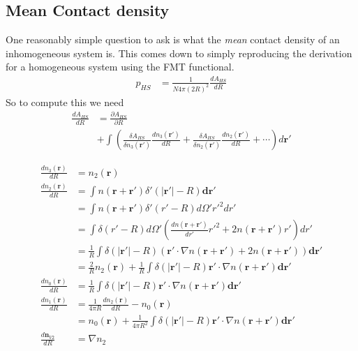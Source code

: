 \documentclass[letterpaper,twocolumn,amsmath,amssymb,prb]{revtex4-1}
\begin{document}
\begin{widetext}

\section{Mean Contact density}

One reasonably simple question to ask is what the \emph{mean} contact
density of an inhomogeneous system is.  This comes down to simply
reproducing the derivation for a homogeneous system using the
FMT functional.
\begin{align}
  p_{HS} &= \frac{1}{N 4\pi (2R)^2} \frac{dA_{HS}}{dR}
\end{align}
So to compute this we need
\begin{align}
  \frac{d A_{HS}}{d R} &=
  \frac{\partial A_{HS}}{\partial R} \\
  &+
  \int \left(
  \frac{\delta A_{HS}}{\delta n_3(\mathbf{r}')}
  \frac{d n_3(\mathbf{r}')}{d R}
  +
  \frac{\delta A_{HS}}{\delta n_2(\mathbf{r}')}
  \frac{d n_2(\mathbf{r}')}{d R}
  + \cdots
  \right) d\mathbf{r}'
\end{align}

\begin{align}
  \frac{dn_3(\mathbf{r})}{dR} &= n_2(\mathbf{r})\\
  \frac{dn_2(\mathbf{r})}{dR} &= \int n(\mathbf{r}+\mathbf{r}')
  \delta'(|\mathbf{r'}| - R)\mathbf{dr}'\\
  &= \int n(\mathbf{r}+\mathbf{r}')
  \delta'(r' - R) d\Omega' r'^2 dr'\\
  &= \int 
  \delta(r' - R) d\Omega' \left(\frac{dn(\mathbf{r}+\mathbf{r}')}{dr'}r'^2 + 2n(\mathbf{r}+\mathbf{r}')r' \right) dr'\\
  &= \frac1{R} \int 
  \delta(|\mathbf{r}'| - R)
  \left(\mathbf{r}'\cdot \nabla n(\mathbf{r}+\mathbf{r}') +
  2n(\mathbf{r}+\mathbf{r}') \right) \mathbf{dr}' \\
  &= \frac{2}{R}n_2(\mathbf{r}) + \frac{1}{R} \int 
  \delta(|\mathbf{r}'| - R)\mathbf{r}'\cdot \nabla n(\mathbf{r}+\mathbf{r}') \mathbf{dr}' \\
  \frac{dn_0(\mathbf{r})}{dR} &= \frac{1}{R} \int 
  \delta(|\mathbf{r}'| - R)\mathbf{r}'\cdot \nabla n(\mathbf{r}+\mathbf{r}') \mathbf{dr}' \\
  \frac{dn_1(\mathbf{r})}{dR} &=
    \frac1{4\pi R}\frac{dn_2(\mathbf{r})}{dR} - n_0(\mathbf{r}) \\
    &= n_0(\mathbf{r}) + \frac{1}{4\pi R^2} \int 
    \delta(|\mathbf{r}'| - R)\mathbf{r}'\cdot \nabla n(\mathbf{r}+\mathbf{r}') \mathbf{dr}' \\
  \frac{d\mathbf{n}_{V2}}{dR} &= \nabla n_2
\end{align}


\end{widetext}
\end{document}
